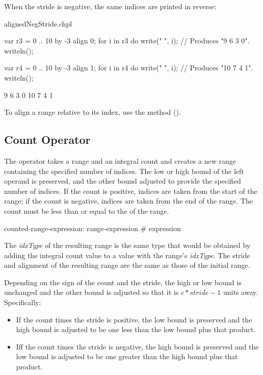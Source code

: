 When the stride is negative, the same indices are printed in reverse:
\begin{chapelexample}{alignedNegStride.chpl}
\begin{chapel}
var r3 = 0 .. 10 by -3 align 0;
for i in r3 do
  write(" ", i);			// Produces "9 6 3 0".
writeln();

var r4 = 0 .. 10 by -3 align 1;
for i in r4 do
  write(" ", i);			// Produces "10 7 4 1".
writeln();
\end{chapel}
\begin{chapeloutput}
 9 6 3 0
 10 7 4 1
\end{chapeloutput}
\end{chapelexample}

To align a range relative to its  index, use
the  method ().


\subsection{Count Operator}
\label{Count_Operator}

The \chpl{#} operator takes a range and an integral count and creates a new
range containing the specified number of indices.  The low or high bound of the
left operand is preserved, and the other bound adjusted to provide the specified
number of indices.  If the count is positive, indices are taken from the start
of the range; if the count is negative, indices are taken from the end of the
range.  The count must be less than or equal to the  of the range.

\begin{syntax}
counted-range-expression:
  range-expression # expression
\end{syntax}

The \emph{idxType} of the resulting range is the same type that would be
obtained by adding the integral count value to a value with the
range's \emph{idxType}.  
The stride and alignment of the resulting range are the same as those
of the initial range.  

Depending on the sign of the count and the stride, the high or low bound is
unchanged and the other bound is adjusted so that it is $c * stride - 1$ units
away.  Specifically:
\begin{itemize}
\item If the count times the stride is positive, the low bound is preserved
and the high bound is adjusted to be one less than the low bound plus that
product.
\item Iff the count times the stride is negative, the high bound is preserved
and the low bound is adjusted to be one greater than the high bound plus that
product.
\end{itemize}

